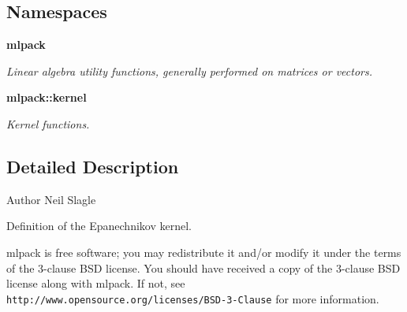 \subsection*{Namespaces}
\begin{DoxyCompactItemize}
\item 
 {\bf mlpack}
\begin{DoxyCompactList}\small\item\em Linear algebra utility functions, generally performed on matrices or vectors. \end{DoxyCompactList}\item 
 {\bf mlpack\+::kernel}
\begin{DoxyCompactList}\small\item\em Kernel functions. \end{DoxyCompactList}\end{DoxyCompactItemize}


\subsection{Detailed Description}
\begin{DoxyAuthor}{Author}
Neil Slagle
\end{DoxyAuthor}
Definition of the Epanechnikov kernel.

mlpack is free software; you may redistribute it and/or modify it under the terms of the 3-\/clause B\+SD license. You should have received a copy of the 3-\/clause B\+SD license along with mlpack. If not, see {\tt http\+://www.\+opensource.\+org/licenses/\+B\+S\+D-\/3-\/\+Clause} for more information. 